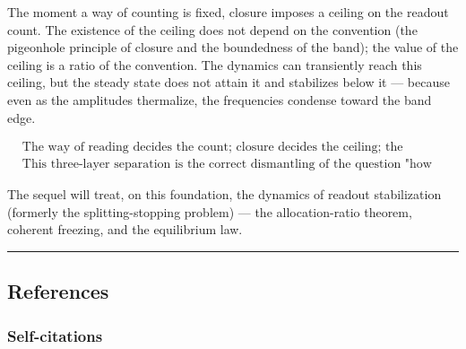 \documentclass[
  a4paper,
]{article}
\begin{document}
The moment a way of counting is fixed, closure imposes a ceiling on the
readout count. The existence of the ceiling does not depend on the
convention (the pigeonhole principle of closure and the boundedness of
the band); the value of the ceiling is a ratio of the convention. The
dynamics can transiently reach this ceiling, but the steady state does
not attain it and stabilizes below it --- because even as the amplitudes
thermalize, the frequencies condense toward the band edge.

\[
\boxed{
\begin{aligned}
&\text{The way of reading decides the count; closure decides the ceiling; the dynamics decides the filling.}\\
&\text{This three-layer separation is the correct dismantling of the question "how many waves are there?"}
\end{aligned}
}
\]

The sequel will treat, on this foundation, the dynamics of readout
stabilization (formerly the splitting-stopping problem) --- the
allocation-ratio theorem, coherent freezing, and the equilibrium law.

\begin{center}\rule{0.5\linewidth}{0.5pt}\end{center}

\subsection{References}\label{references}

\subsubsection{Self-citations}\label{self-citations}
\end{document}
